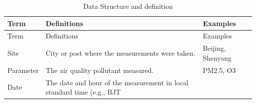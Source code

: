 \documentclass[12pt,]{article}
\begin{document}
\begin{longtable}[]{@{}lll@{}}
\caption{Data Structure and definition}\tabularnewline
\toprule
\begin{minipage}[b]{0.14\columnwidth}\raggedright\strut
Term\strut
\end{minipage} & \begin{minipage}[b]{0.60\columnwidth}\raggedright\strut
Definitions\strut
\end{minipage} & \begin{minipage}[b]{0.11\columnwidth}\raggedright\strut
Examples\strut
\end{minipage}\tabularnewline
\midrule
\endfirsthead
\toprule
\begin{minipage}[b]{0.14\columnwidth}\raggedright\strut
Term\strut
\end{minipage} & \begin{minipage}[b]{0.60\columnwidth}\raggedright\strut
Definitions\strut
\end{minipage} & \begin{minipage}[b]{0.11\columnwidth}\raggedright\strut
Examples\strut
\end{minipage}\tabularnewline
\midrule
\endhead
\begin{minipage}[t]{0.14\columnwidth}\raggedright\strut
Site\strut
\end{minipage} & \begin{minipage}[t]{0.60\columnwidth}\raggedright\strut
City or post where the measurements were taken.\strut
\end{minipage} & \begin{minipage}[t]{0.11\columnwidth}\raggedright\strut
Beijing, Shenyang\strut
\end{minipage}\tabularnewline
\begin{minipage}[t]{0.14\columnwidth}\raggedright\strut
Parameter\strut
\end{minipage} & \begin{minipage}[t]{0.60\columnwidth}\raggedright\strut
The air quality pollutant measured.\strut
\end{minipage} & \begin{minipage}[t]{0.11\columnwidth}\raggedright\strut
PM2.5, O3\strut
\end{minipage}\tabularnewline
\begin{minipage}[t]{0.14\columnwidth}\raggedright\strut
Date\strut
\end{minipage} & \begin{minipage}[t]{0.60\columnwidth}\raggedright\strut
The date and hour of the measurement in local standard time (e.g., BJT

\end{minipage}
\end{longtable}
\end{document}
